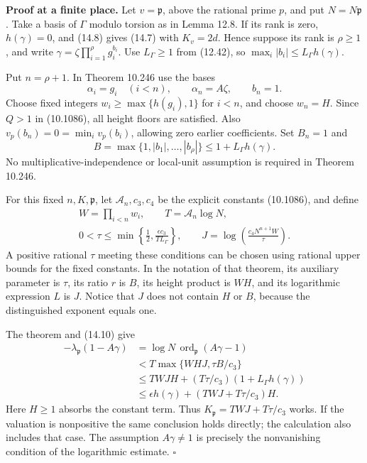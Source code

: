 \documentclass[
  11pt,
  a4paper,
]{article}
\begin{document}
\textbf{Proof at a finite place.} Let \(v=\mathfrak p\), above the
rational prime \(p\), and put \(N=N\mathfrak p\). Take a basis of
\(\Gamma\) modulo torsion as in Lemma 12.8. If its rank is zero,
\(h(\gamma)=0\), and (14.8) gives (14.7) with \(K_v=2d\). Hence suppose
its rank is \(\rho\ge1\), and write
\(\gamma=\zeta\prod_{i=1}^{\rho}g_i^{b_i}\). Use \(L_\Gamma\ge1\) from
(12.42), so \(\max_i|b_i|\le L_\Gamma h(\gamma)\).

Put \(n=\rho+1\). In Theorem 10.246 use the bases \[
\alpha_i=g_i\quad(i<n),\qquad \alpha_n=A\zeta,
\qquad b_n=1.
\tag{14.9}
\] Choose fixed integers \(w_i\ge\max\{h(g_i),1\}\) for \(i<n\), and
choose \(w_n=H\). Since \(Q>1\) in (10.1086), all height floors are
satisfied. Also \(v_p(b_n)=0=\min_i v_p(b_i)\), allowing zero earlier
coefficients. Set \(B_n=1\) and \[
B=\max\{1,|b_1|,\ldots,|b_\rho|\}
 \le1+L_\Gamma h(\gamma).
\tag{14.10}
\] No multiplicative-independence or local-unit assumption is required
in Theorem 10.246.

For this fixed \(n,K,\mathfrak p\), let \(\mathcal A_n,c_3,c_4\) be the
explicit constants (10.1086), and define \[
\begin{gathered}
W=\prod_{i<n}w_i,\qquad T=\mathcal A_n\log N,\\
0<\tau\le\min\left\{\frac12,
          \frac{\epsilon c_3}{T L_\Gamma}\right\},\qquad
J=\log\left(\frac{c_4N^{n+1}W}{\tau}\right).
\end{gathered}
\tag{14.11}
\] A positive rational \(\tau\) meeting these conditions can be chosen
using rational upper bounds for the fixed constants. In the notation of
that theorem, its auxiliary parameter is \(\tau\), its ratio \(r\) is
\(B\), its height product is \(WH\), and its logarithmic expression
\(L\) is \(J\). Notice that \(J\) does not contain \(H\) or \(B\),
because the distinguished exponent equals one.

The theorem and (14.10) give \[
\begin{aligned}
-\lambda_{\mathfrak p}(1-A\gamma)
 &=\log N\,\operatorname{ord}_{\mathfrak p}(A\gamma-1)\\
 &<T\max\{WHJ,\tau B/c_3\}\\
 &\le TWJH+(T\tau/c_3)(1+L_\Gamma h(\gamma))\\
 &\le\epsilon h(\gamma)+(TWJ+T\tau/c_3)H .
\end{aligned}
\tag{14.12}
\] Here \(H\ge1\) absorbs the constant term. Thus
\(K_{\mathfrak p}=TWJ+T\tau/c_3\) works. If the valuation is nonpositive
the same conclusion holds directly; the calculation also includes that
case. The assumption \(A\gamma\ne1\) is precisely the nonvanishing
condition of the logarithmic estimate. \(\square\)
\end{document}
